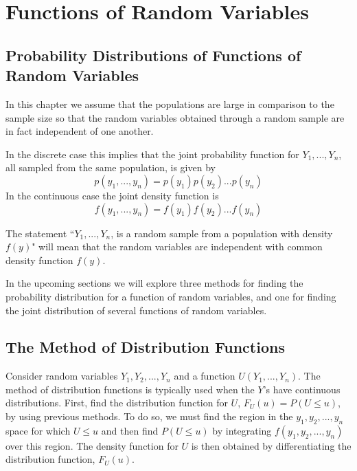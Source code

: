 \documentclass[12pt, a4paper, twoside, openright, titlepage]{book}
\begin{document}
\chapter{Functions of Random Variables}

\section{\textsection Probability Distributions of Functions of Random Variables}

In this chapter we assume that the populations are large in comparison to the sample size so that the random variables obtained through a random sample are in fact independent of one another.

In the discrete case this implies that the joint probability function for $Y_1,...,Y_n$, all sampled from the same population, is given by \begin{equation*}
    p(y_1,...,y_n) = p(y_1)p(y_2)...p(y_n)
\end{equation*}
In the continuous case the joint density function is \begin{equation*}
    f(y_1,...,y_n) = f(y_1)f(y_2)...f(y_n)
\end{equation*}

The statement ``$Y_1,...,Y_n$, is a random sample from a population with density $f(y)$" will mean that the random variables are independent with common density function $f(y)$.


In the upcoming sections we will explore three methods for finding the probability distribution for a function of random variables, and one for finding the joint distribution of several functions of random variables.

\section{\textsection The Method of Distribution Functions}

\begin{rmk}{}{}
    Consider random variables $Y_1,Y_2,...,Y_n$ and a function $U(Y_1,...,Y_n)$. The method of distribution functions is typically used when the $Y$'s have continuous distributions. First, find the distribution function for $U$, $F_U(u) = P(U\leq u)$, by using previous methods. To do so, we must find the region in the $y_1,y_2,...,y_n$ space for which $U \leq u$ and then find $P(U\leq u)$ by integrating $f(y_1,y_2,...,y_n)$ over this region. The density function for $U$ is then obtained by differentiating the distribution function, $F_U(u)$. 
\end{rmk}
\end{document}
